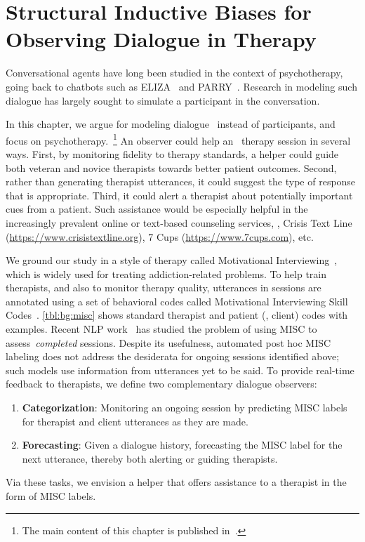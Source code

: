 \chapter[Structural Inductive Biases for Observing Dialogue in \\
  Therapy]{Structural Inductive Biases for Observing Dialogue in
  Therapy}
\label{chap:snt}

Conversational agents have long been studied in the context of
psychotherapy, going back to chatbots such as
ELIZA~\citep{weizenbaum1966eliza} and
PARRY~\citep{colby1975artificial}. Research in modeling such dialogue
has largely sought to simulate a participant in the conversation.

In this chapter, we argue for modeling dialogue~ instead
of participants, and focus on psychotherapy.~\footnote{The main content
  of this chapter is published in~\citet{jie2019psycdialacl}.} An
observer could help an~ therapy session in several ways.
First, by monitoring fidelity to therapy standards, a helper could
guide both veteran and novice therapists towards better patient
outcomes. Second, rather than generating therapist utterances, it
could suggest the type of response that is appropriate. Third, it
could alert a therapist about potentially important cues from a
patient.
%
Such assistance would be especially helpful in the increasingly
prevalent online or text-based counseling services, \eg, Crisis Text
Line (\url{https://www.crisistextline.org}), 7 Cups
(\url{https://www.7cups.com}), etc.

We ground our study in a style of therapy called Motivational
Interviewing~\citep[MI,][]{miller2003motivational,miller2012motivational},
which is widely used for treating addiction-related problems.
%
To help train therapists, and also to monitor therapy quality,
utterances in sessions are annotated using a set of behavioral codes
called Motivational Interviewing Skill
Codes~\citep[MISC,][]{miller2003manual}. \autoref{tbl:bg:misc} shows
standard therapist and patient (\ie, client) codes with
examples. Recent NLP work~\cite[][{\em inter
  alia}]{tanana2016comparison, xiao2016behavioral,
  perez2017predicting, huang2018modeling} has studied the problem of
using MISC to assess~\emph{completed} sessions.  Despite its
usefulness, automated post hoc MISC labeling does not address the
desiderata for ongoing sessions identified above; such models use
information from utterances yet to be said. To provide real-time
feedback to therapists, we define two complementary dialogue
observers:
\begin{enumerate}[nosep]
\item \textbf{Categorization}: Monitoring an ongoing session by
  predicting MISC labels for therapist and client utterances as they
  are made.
\item \textbf{Forecasting}: Given a dialogue history, forecasting
  the MISC label for the next utterance, thereby both alerting or
  guiding therapists.
\end{enumerate}
Via these tasks, we envision a helper that offers assistance to a
therapist in the form of MISC labels.

